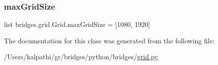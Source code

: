 \subsubsection{\texorpdfstring{maxGridSize}{maxGridSize}}
{\footnotesize\ttfamily list bridges.\+grid.\+Grid.\+max\+Grid\+Size = \mbox{[}1080, 1920\mbox{]}\hspace{0.3cm}{\ttfamily [static]}}



The documentation for this class was generated from the following file\+:\begin{DoxyCompactItemize}
\item 
/\+Users/kalpathi/gr/bridges/python/bridges/\mbox{\hyperlink{grid_8py}{grid.\+py}}\end{DoxyCompactItemize}
